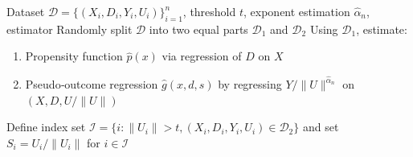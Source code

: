 \documentclass[12pt]{article}
\theoremstyle{plain}
\theoremstyle{definition}
\begin{document}
\begin{algorithm}[!tb]
  \caption{Algorithm for NETE Estimation}\label{alg:nete}
  \begin{algorithmic}[1]
    \REQUIRE Dataset $\mathcal{D}=\{(X_i,D_i,Y_i,U_i)\}_{i=1}^n$, threshold $t$, exponent estimation $ \hat{\alpha}_{n} $, estimator
    \STATE Randomly split $\mathcal{D}$ into two equal parts $\mathcal{D}_1$ and $\mathcal{D}_2$
    \STATE Using $\mathcal{D}_1$, estimate:
    \begin{enumerate}[label=\alph*.]
      \item Propensity function $\hat p(x)$ via regression of $D$ on $X$
      \item Pseudo‐outcome regression $\hat g(x,d,s)$ by regressing $Y/\|U\|^{\hat{\alpha}_{n}}$ on $(X,D,U/\|U\|)$
    \end{enumerate}
    \STATE Define index set $\mathcal{I}=\{i:\|U_i\|>t, (X_i,D_i,Y_i,U_i)\in\mathcal{D}_2\}$ and set $S_i=U_i/\|U_i\|$ for $i\in\mathcal{I}$


\end{algorithmic}
\end{algorithm}
\end{document}

